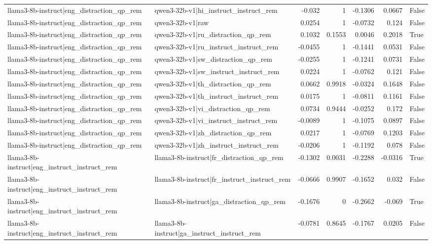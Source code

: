 \begin{table}
\begin{tabular}{l l r r r r l}
llama3-8b-instruct|eng_distraction_qp_rem & qwen3-32b-v1|hi_instruct_instruct_rem & -0.032 & 1 & -0.1306 & 0.0667 & False \\
llama3-8b-instruct|eng_distraction_qp_rem & qwen3-32b-v1|raw & 0.0254 & 1 & -0.0732 & 0.124 & False \\
llama3-8b-instruct|eng_distraction_qp_rem & qwen3-32b-v1|ru_distraction_qp_rem & 0.1032 & 0.1553 & 0.0046 & 0.2018 & True \\
llama3-8b-instruct|eng_distraction_qp_rem & qwen3-32b-v1|ru_instruct_instruct_rem & -0.0455 & 1 & -0.1441 & 0.0531 & False \\
llama3-8b-instruct|eng_distraction_qp_rem & qwen3-32b-v1|sw_distraction_qp_rem & -0.0255 & 1 & -0.1241 & 0.0731 & False \\
llama3-8b-instruct|eng_distraction_qp_rem & qwen3-32b-v1|sw_instruct_instruct_rem & 0.0224 & 1 & -0.0762 & 0.121 & False \\
llama3-8b-instruct|eng_distraction_qp_rem & qwen3-32b-v1|th_distraction_qp_rem & 0.0662 & 0.9918 & -0.0324 & 0.1648 & False \\
llama3-8b-instruct|eng_distraction_qp_rem & qwen3-32b-v1|th_instruct_instruct_rem & 0.0175 & 1 & -0.0811 & 0.1161 & False \\
llama3-8b-instruct|eng_distraction_qp_rem & qwen3-32b-v1|vi_distraction_qp_rem & 0.0734 & 0.9444 & -0.0252 & 0.172 & False \\
llama3-8b-instruct|eng_distraction_qp_rem & qwen3-32b-v1|vi_instruct_instruct_rem & -0.0089 & 1 & -0.1075 & 0.0897 & False \\
llama3-8b-instruct|eng_distraction_qp_rem & qwen3-32b-v1|zh_distraction_qp_rem & 0.0217 & 1 & -0.0769 & 0.1203 & False \\
llama3-8b-instruct|eng_distraction_qp_rem & qwen3-32b-v1|zh_instruct_instruct_rem & -0.0206 & 1 & -0.1192 & 0.078 & False \\
llama3-8b-instruct|eng_instruct_instruct_rem & llama3-8b-instruct|fr_distraction_qp_rem & -0.1302 & 0.0031 & -0.2288 & -0.0316 & True \\
llama3-8b-instruct|eng_instruct_instruct_rem & llama3-8b-instruct|fr_instruct_instruct_rem & -0.0666 & 0.9907 & -0.1652 & 0.032 & False \\
llama3-8b-instruct|eng_instruct_instruct_rem & llama3-8b-instruct|ga_distraction_qp_rem & -0.1676 & 0 & -0.2662 & -0.069 & True \\
llama3-8b-instruct|eng_instruct_instruct_rem & llama3-8b-instruct|ga_instruct_instruct_rem & -0.0781 & 0.8645 & -0.1767 & 0.0205 & False \\

\end{tabular}
\end{table}
